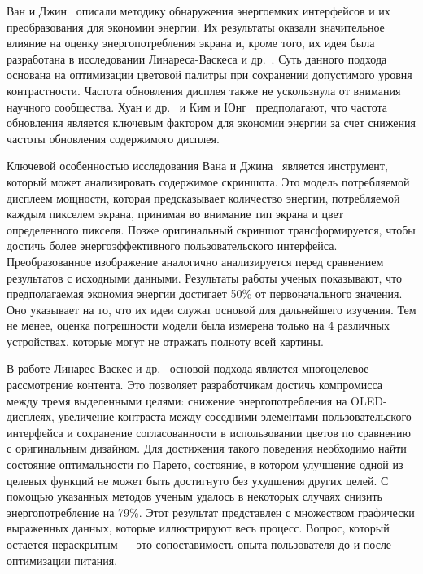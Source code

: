 \documentclass[a4paper,14pt]{extarticle} %
\begin{document}
	Ван и Джин~\parencite{wan2015detecting} описали методику обнаружения энергоемких интерфейсов и их преобразования для экономии энергии. Их результаты оказали значительное влияние на оценку энергопотребления экрана и, кроме того, их идея была разработана в исследовании Линареса-Васкеса и др.~\parencite{linares2018multi}. Суть данного подхода основана на оптимизации цветовой палитры при сохранении допустимого уровня контрастности. Частота обновления дисплея также не ускользнула от внимания научного сообщества. Хуан и др.~\parencite{huang2014intelligent} и Ким и Юнг~\parencite{kim2014content} предполагают, что частота обновления является ключевым фактором для экономии энергии за счет снижения частоты обновления содержимого дисплея.
	
	Ключевой особенностью исследования Вана и Джина~\parencite{wan2015detecting} является инструмент, который может анализировать содержимое скриншота. Это модель потребляемой дисплеем мощности, которая предсказывает количество энергии, потребляемой каждым пикселем экрана, принимая во внимание тип экрана и цвет определенного пикселя. Позже оригинальный скриншот трансформируется, чтобы достичь более энергоэффективного пользовательского интерфейса. Преобразованное изображение аналогично анализируется перед сравнением результатов с исходными данными. Результаты работы ученых показывают, что предполагаемая экономия энергии достигает 50\% от первоначального значения. Оно указывает на то, что их идеи служат основой для дальнейшего изучения. Тем не менее, оценка погрешности модели была измерена только на 4 различных устройствах, которые могут не отражать полноту всей картины.
	
	В работе Линарес-Васкес и др.~\parencite{linares2018multi} основой подхода является многоцелевое рассмотрение контента. Это позволяет разработчикам достичь компромисса между тремя выделенными целями: снижение энергопотребления на OLED-дисплеях, увеличение контраста между соседними элементами пользовательского интерфейса и сохранение согласованности в использовании цветов по сравнению с оригинальным дизайном. Для достижения такого поведения необходимо найти состояние оптимальности по Парето, состояние, в котором улучшение одной из целевых функций не может быть достигнуто без ухудшения других целей. С помощью указанных методов ученым удалось в некоторых случаях снизить энергопотребление на 79\%. Этот результат представлен с множеством графически выраженных данных, которые иллюстрируют весь процесс. Вопрос, который остается нераскрытым — это сопоставимость опыта пользователя до и после оптимизации питания.
	
\end{document}
